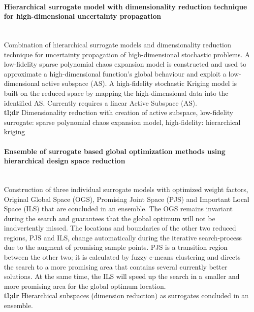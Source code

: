 \documentclass[preprint,12pt]{elsarticle}
\begin{document}
\paragraph{Hierarchical surrogate model with dimensionality reduction technique for high-dimensional uncertainty propagation}
\cite{cheng2020hierarchical} \\
Combination of hierarchical surrogate models and dimensionality reduction technique for uncertainty propagation of high-dimensional stochastic problems.
A low-fidelity sparse polynomial chaos expansion model is constructed and used to approximate a high-dimensional function's global behaviour and exploit a low-dimensional active subspace (AS). 
A high-fidelity stochastic Kriging model is built on the reduced space by mapping the high-dimensional data into the identified AS. 
Currently requires a linear Active Subspace (AS).
\\ \textbf{tl;dr} Dimensionality reduction with creation of active subspace, low-fidelity surrogate: sparse polynomial chaos expansion model, high-fidelity: hierarchical kriging
\paragraph{Ensemble of surrogate based global optimization methods using hierarchical design space reduction}
\cite{ye2018ensemble}\\
Construction of three individual surrogate models with optimized weight factors, Original Global Space (OGS), Promising Joint Space (PJS) and Important Local Space (ILS) that are concluded in an ensemble.
The OGS remains invariant during the search and guarantees that the global optimum will not be inadvertently missed. The locations and boundaries of the other two reduced regions, PJS and ILS, change automatically during the iterative search-process due to the augment of promising sample points. PJS is a transition region between the other two; it is calculated by fuzzy c-means clustering and directs the search to a more promising area that contains several currently better solutions. At the same time, the ILS will speed up the search in a smaller and more promising area for the global optimum location.
\\
\textbf{tl;dr} Hierarchical subspaces (dimension reduction) as surrogates concluded in an ensemble.
\end{document}
